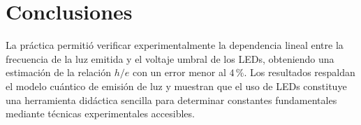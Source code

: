 \documentclass{article}
\begin{document}
\section{Conclusiones}

La práctica permitió verificar experimentalmente la dependencia
lineal entre la frecuencia de la luz emitida y el voltaje umbral de los LEDs,
obteniendo una estimación de la relación $h/e$ con un error menor al $4\,\%$.
Los resultados respaldan el modelo cuántico de emisión de luz y muestran que el
uso de LEDs constituye una herramienta didáctica sencilla para determinar
constantes fundamentales mediante técnicas experimentales accesibles.
\end{document}
